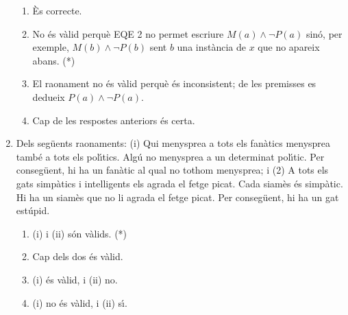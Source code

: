 \begin{enumerate}
\begin{enumerate}
\item \`{E}s correcte.

\item No \'{e}s v\`{a}lid perqu\`{e} EQE 2 no permet escriure $M(a)\wedge\lnot
P(a)$ sin\'{o}, per exemple, $M(b)\wedge\lnot P(b)$ sent $b$ una inst\`{a}ncia
de $x$ que no apareix abans. (*)

\item El raonament no \'{e}s v\`{a}lid perqu\`{e} \'{e}s inconsistent; de les
premisses es dedueix $P(a)\wedge\lnot P(a)$.

\item Cap de les respostes anteriors \'{e}s certa.
\end{enumerate}

\item Dels seg\"{u}ents raonaments: (i) Qui menysprea a tots els fan\`{a}tics
menysprea tamb\'{e} a tots els pol\'{\i}tics. Alg\'{u} no menysprea a un
determinat pol\'{\i}tic. Per conseg\"{u}ent, hi ha un fan\`{a}tic al qual no
tothom menysprea; i (2) A tots els gats simp\`{a}tics i
intel\textperiodcentered ligents els agrada el fetge picat. Cada siam\`{e}s
\'{e}s simp\`{a}tic. Hi ha un siam\`{e}s que no li agrada el fetge picat. Per
conseg\"{u}ent, hi ha un gat est\'{u}pid.

\begin{enumerate}
\item (i) i (ii) s\'{o}n v\`{a}lids. (*)

\item Cap dels dos \'{e}s v\`{a}lid.

\item (i) \'{e}s v\`{a}lid, i (ii) no.

\item (i) no \'{e}s v\`{a}lid, i (ii) s\'{\i}.
\end{enumerate}
\end{enumerate}
